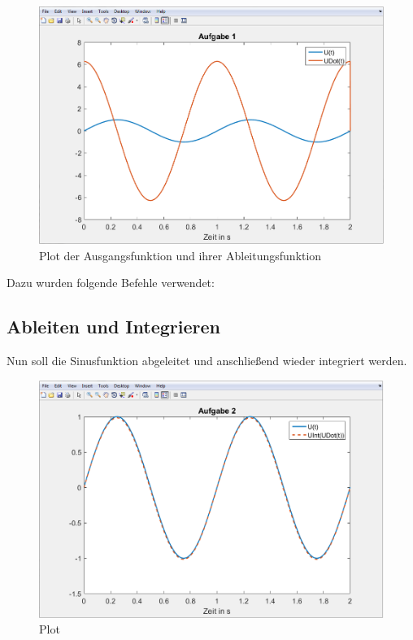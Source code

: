 \documentclass[%
  a4paper, %
  12pt, %
   article, %
  titlepage
]{scrartcl}
\begin{document}
\begin{figure}[h]
\includegraphics[width=\textwidth]{plot1.png}
\caption{Plot der Ausgangsfunktion und ihrer Ableitungsfunktion}
\label{fig3}
\end{figure}

Dazu wurden folgende Befehle verwendet:



\newpage

 \subsection{Ableiten und Integrieren}

Nun soll die Sinusfunktion abgeleitet und anschließend wieder integriert werden.


\begin{figure}[h]
\includegraphics[width=\textwidth]{plot2.png}
\caption{Plot}
\label{fig4}
\end{figure}
\end{document}
